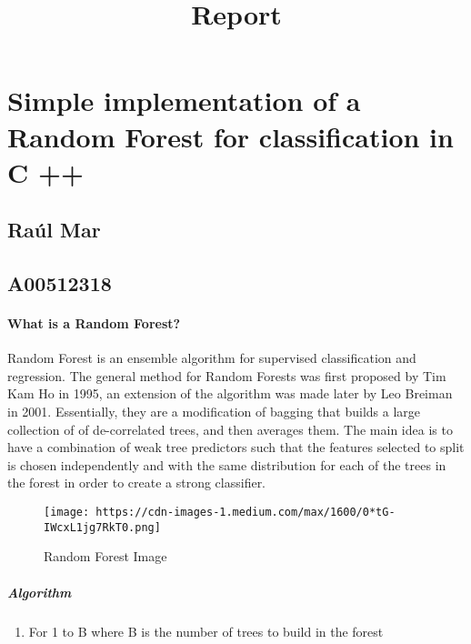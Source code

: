 \documentclass[11pt]{article}
\title{Report}
\makeatletter
\def\maxwidth{\ifdim\Gin@nat@width>\linewidth\linewidth
    \else\Gin@nat@width\fi}
\let\Oldincludegraphics\includegraphics
\renewcommand{\includegraphics}[1]{\Oldincludegraphics[width=.8\maxwidth]{#1}}
\providecommand{\tightlist}{%
      \setlength{\itemsep}{0pt}\setlength{\parskip}{0pt}}
\makeatother
\begin{document}
    
    
    \maketitle
    
    

    
    \section{Simple implementation of a Random Forest for classification in
C
++}\label{simple-implementation-of-a-random-forest-for-classification-in-c}

\subsection{Raúl Mar}\label{rauxfal-mar}

\subsection{A00512318}\label{a00512318}

    \paragraph{What is a Random Forest?}\label{what-is-a-random-forest}

Random Forest is an ensemble algorithm for supervised classification and
regression. The general method for Random Forests was first proposed by
Tim Kam Ho in 1995, an extension of the algorithm was made later by Leo
Breiman in 2001. Essentially, they are a modification of bagging that
builds a large collection of of de-correlated trees, and then averages
them. The main idea is to have a combination of weak tree predictors
such that the features selected to split is chosen independently and
with the same distribution for each of the trees in the forest in order
to create a strong classifier.

\begin{figure}
\centering
\texttt{[image: https://cdn-images-1.medium.com/max/1600/0*tG-IWcxL1jg7RkT0.png]}
\caption{Random Forest Image}
\end{figure}

\subparagraph{Algorithm}\label{algorithm}

\begin{enumerate}
\def\labelenumi{\arabic{enumi}.}
\tightlist
\item
  For 1 to B where B is the number of trees to build in the forest
\end{enumerate}
\end{document}
